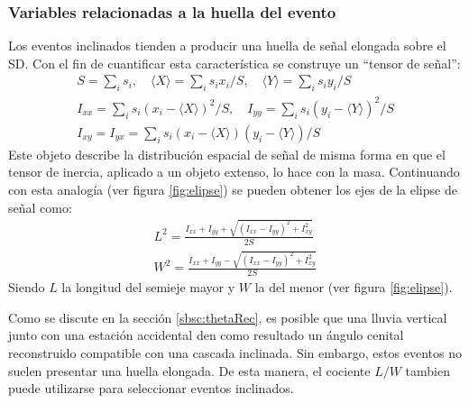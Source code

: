 		\subsubsection{Variables relacionadas a la huella del evento}
		Los eventos inclinados tienden a producir una huella de señal elongada sobre el SD.
		Con el fin de cuantificar esta característica se construye un ``tensor de señal'':
		\begin{eqnarray}
		S = \sum_i s_i, \quad \langle X \rangle = \sum_i s_i x_i/S, \quad \langle Y \rangle = \sum_i s_i y_i/S \nonumber \\
		I_{xx} = \sum_i s_i (x_i - \langle X \rangle)^2 / S, \quad I_{yy} = \sum_i s_i (y_i - \langle Y \rangle)^2 / S \nonumber \\
		I_{xy} = I_{yx} = \sum_i s_i (x_i - \langle X \rangle)(y_i - \langle Y \rangle) / S 
		\end{eqnarray}
		Este objeto describe la distribución espacial de señal de misma forma en que el tensor de inercia, aplicado a un objeto extenso, lo hace con la masa.
		Continuando con esta analogía (ver figura \ref{fig:elipse}) se pueden obtener los ejes de la elipse de señal como:
		\begin{eqnarray}
		L^2 =\frac{I_{xx}+I_{yy}+\sqrt{(I_{xx}-I_{yy})^2 + I_{xy}^2 }}{2S} \nonumber\\
		W^2 =\frac{I_{xx}+I_{yy}-\sqrt{(I_{xx}-I_{yy})^2 + I_{xy}^2 }}{2S} 
		\end{eqnarray}
		Siendo $L$ la longitud del semieje mayor y $W$ la del menor (ver figura \ref{fig:elipse}).

		Como se discute en la sección \ref{sbsc:thetaRec}, es posible que una lluvia vertical junto con una estación accidental den como resultado un ángulo cenital reconstruido compatible con una cascada inclinada.
		Sin embargo, estos eventos no suelen presentar una huella elongada.
		De esta manera, el cociente $L/W$ tambien puede utilizarse para seleccionar eventos inclinados.
		
